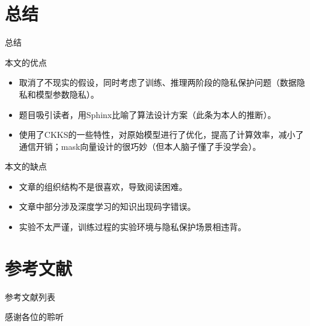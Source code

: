 \documentclass{beamer}
\begin{document}
\section{总结}
\begin{frame}{总结}	
\begin{exampleblock}{本文的优点}
	\begin{itemize}[<+-| alert@+>]
        \item {\footnotesize 取消了不现实的假设，同时考虑了训练、推理两阶段的隐私保护问题（数据隐私和模型参数隐私）。}
        \item {\footnotesize 题目吸引读者，用Sphinx比喻了算法设计方案（此条为本人的推断）。}
        \item {\footnotesize 使用了CKKS的一些特性，对原始模型进行了优化，提高了计算效率，减小了通信开销；mask向量设计的很巧妙（但本人脑子懂了手没学会）。}
    	\end{itemize}
    \end{exampleblock}
\begin{exampleblock}{本文的缺点}
	\begin{itemize}[<+-| alert@+>]
        \item {\footnotesize 文章的组织结构不是很喜欢，导致阅读困难。}
        \item {\footnotesize 文章中部分涉及深度学习的知识出现码字错误。}
        \item {\footnotesize 实验不太严谨，训练过程的实验环境与隐私保护场景相违背。}
    	\end{itemize}
    \end{exampleblock}
\end{frame}




\section{参考文献}
\begin{frame}[allowframebreaks]{参考文献列表}
    
%    
    \tiny 
\end{frame}



\begin{frame}
    \begin{center}
        {\Huge\calligra 感谢各位的聆听}
    \end{center}
    
\end{frame}
\end{document}
